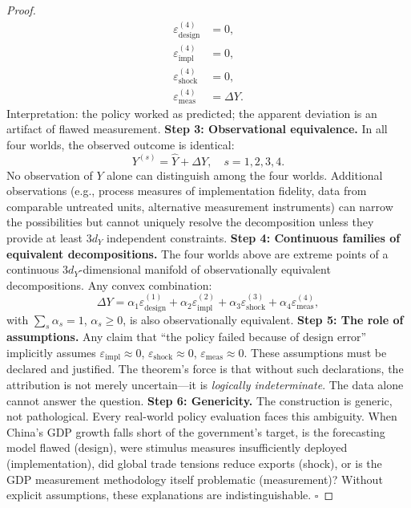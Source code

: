 \documentclass[11pt,a4paper]{article}
\theoremstyle{definition}
\begin{document}
\begin{proof}
\begin{align}
    \varepsilon_{\mathrm{design}}^{(4)} &= 0, \\
    \varepsilon_{\mathrm{impl}}^{(4)} &= 0, \\
    \varepsilon_{\mathrm{shock}}^{(4)} &= 0, \\
    \varepsilon_{\mathrm{meas}}^{(4)} &= \Delta Y.
\end{align}
Interpretation: the policy worked as predicted; the apparent deviation is an artifact of flawed measurement.
\textbf{Step 3: Observational equivalence.} In all four worlds, the observed outcome is identical:
\begin{equation}
    Y^{(s)} = \hat{Y} + \Delta Y, \quad s = 1, 2, 3, 4.
    \label{eq:identical_Y}
\end{equation}
No observation of $Y$ alone can distinguish among the four worlds. Additional observations (e.g., process measures of implementation fidelity, data from comparable untreated units, alternative measurement instruments) can narrow the possibilities but cannot uniquely resolve the decomposition unless they provide at least $3 d_Y$ independent constraints.
\textbf{Step 4: Continuous families of equivalent decompositions.} The four worlds above are extreme points of a continuous $3 d_Y$-dimensional manifold of observationally equivalent decompositions. Any convex combination:
\begin{equation}
    \Delta Y = \alpha_1 \varepsilon_{\mathrm{design}}^{(1)} + \alpha_2 \varepsilon_{\mathrm{impl}}^{(2)} + \alpha_3 \varepsilon_{\mathrm{shock}}^{(3)} + \alpha_4 \varepsilon_{\mathrm{meas}}^{(4)},
    \label{eq:convex_combination}
\end{equation}
with $\sum_s \alpha_s = 1$, $\alpha_s \geq 0$, is also observationally equivalent.
\textbf{Step 5: The role of assumptions.} Any claim that ``the policy failed because of design error'' implicitly assumes $\varepsilon_{\mathrm{impl}} \approx 0$, $\varepsilon_{\mathrm{shock}} \approx 0$, $\varepsilon_{\mathrm{meas}} \approx 0$. These assumptions must be declared and justified. The theorem's force is that without such declarations, the attribution is not merely uncertain---it is \textit{logically indeterminate}. The data alone cannot answer the question.
\textbf{Step 6: Genericity.} The construction is generic, not pathological. Every real-world policy evaluation faces this ambiguity. When China's GDP growth falls short of the government's target, is the forecasting model flawed (design), were stimulus measures insufficiently deployed (implementation), did global trade tensions reduce exports (shock), or is the GDP measurement methodology itself problematic (measurement)? Without explicit assumptions, these explanations are indistinguishable. $\square$
\end{proof}
\end{document}
